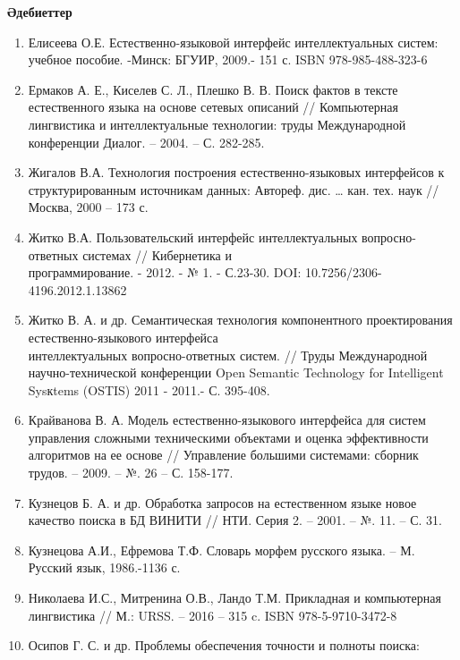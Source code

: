 \begin{center}
  {\bfseries Әдебиеттер}
  \end{center}

\begin{noparindent}

\begin{enumerate}
\def\labelenumi{\arabic{enumi}.}
\item
  Елисеева О.Е. Естественно-языковой интерфейс интеллектуальных систем:
  учебное пособие. -Минск: БГУИР, 2009.- 151 с. ISBN 978-985-488-323-6
\item
  Ермаков А. Е., Киселев С. Л., Плешко В. В. Поиск фактов в тексте
  естественного языка на основе сетевых описаний // Компьютерная
  лингвистика и интеллектуальные технологии: труды Международной
  конференции Диалог. -- 2004. -- С. 282-285.
\item
  Жигалов В.А. Технология построения естественно-языковых интерфейсов к
  структурированным источникам данных: Автореф. дис. \ldots{} кан. тех.
  наук // Москва, 2000 -- 173 с.
\item
  Житко В.А. Пользовательский интерфейс интеллектуальных
  вопросно-ответных системах // Кибернетика и \\программирование. - 2012.
  - № 1. - С.23-30. DOI: 10.7256/2306-4196.2012.1.13862
\item
  Житко В. А. и др. Семантическая технология компонентного
  проектирования естественно-языкового интерфейса \\интеллектуальных
  вопросно-ответных систем. // Труды Международной научно-технической
  конференции Open Semantic Technology for Intelligent Sysкtems (OSTIS)
  2011 - 2011.- С. 395-408.
\item
  Крайванова В. А. Модель естественно-языкового интерфейса для систем
  управления сложными техническими объектами и оценка эффективности
  алгоритмов на ее основе // Управление большими системами: сборник
  трудов. -- 2009. -- №. 26 -- С. 158-177.
\item
  Кузнецов Б. А. и др. Обработка запросов на естественном языке новое
  качество поиска в БД ВИНИТИ // НТИ. Серия 2. -- 2001. -- №. 11. -- С.
  31.
\item
  Кузнецова А.И., Ефремова Т.Ф. Словарь морфем русского языка. -- М.
  Русский язык, 1986.-1136 с.
\item
  Николаева И.С., Митренина О.В., Ландо Т.М. Прикладная и компьютерная
  лингвистика // М.: URSS. -- 2016 -- 315 c. ISBN 978-5-9710-3472-8
\item
  Осипов Г. С. и др. Проблемы обеспечения точности и полноты поиска:

\end{enumerate}
\end{noparindent}

